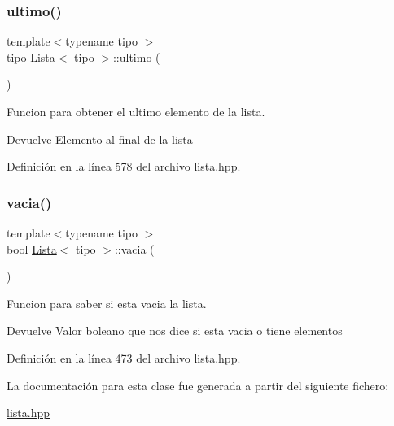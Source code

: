\subsubsection{\texorpdfstring{ultimo()}{ultimo()}}
{\footnotesize\ttfamily template$<$typename tipo $>$ \\
tipo \hyperlink{classLista}{Lista}$<$ tipo $>$\+::ultimo (\begin{DoxyParamCaption}{ }\end{DoxyParamCaption})}



Funcion para obtener el ultimo elemento de la lista. 

\begin{DoxyReturn}{Devuelve}
Elemento al final de la lista 
\end{DoxyReturn}


Definición en la línea 578 del archivo lista.\+hpp.

\mbox{\label{classLista_a92650be08dd29c9800da07c65ad6ff3a}} 
\subsubsection{\texorpdfstring{vacia()}{vacia()}}
{\footnotesize\ttfamily template$<$typename tipo $>$ \\
bool \hyperlink{classLista}{Lista}$<$ tipo $>$\+::vacia (\begin{DoxyParamCaption}{ }\end{DoxyParamCaption})}



Funcion para saber si esta vacia la lista. 

\begin{DoxyReturn}{Devuelve}
Valor boleano que nos dice si esta vacia o tiene elementos 
\end{DoxyReturn}


Definición en la línea 473 del archivo lista.\+hpp.



La documentación para esta clase fue generada a partir del siguiente fichero\+:\begin{DoxyCompactItemize}
\item 
\hyperlink{lista_8hpp}{lista.\+hpp}\end{DoxyCompactItemize}
